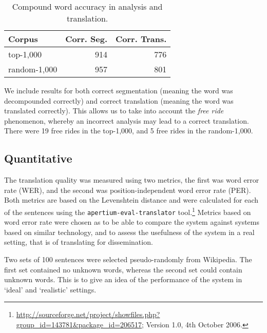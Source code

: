 \documentclass[11pt]{article}
\begin{document}
\begin{table}
  \begin{center}
  \begin{tabular}{|l|r|r|}
   \hline
   {\bf Corpus}    & {\bf Corr. Seg.}    & {\bf Corr. Trans.}\\
   \hline
   top-1,000       & 914                 &  776 \\ 
   \hline
   random-1,000    & 957                 &  801 \\ 
   \hline
  \end{tabular}
    \caption{Compound word accuracy in analysis and translation.}
    \label{table:compounds}
  \end{center}
\end{table}

We include results for both correct segmentation (meaning the word was decompounded 
correctly) and correct translation (meaning the word was translated correctly). This allows
us to take into account the {\em free ride} phenomenon, whereby an incorrect analysis
may lead to a correct translation. There were 19 free rides in the top-1,000, and 5 free 
rides in the random-1,000.

\subsection{Quantitative}

The translation quality was measured using two metrics, the first was word error rate (WER), and the 
second was position-independent word error rate (PER). Both metrics are based on the Levenshtein 
distance \cite{Levenshtein:65} and were calculated for each of the sentences using the 
{\small \texttt{apertium-eval-translator}} tool.\footnote{\url{http://sourceforge.net/project/showfiles.php?group_id=143781&package_id=206517}; Version 1.0, 4th October 2006.} Metrics based on word error rate were chosen as to be able to compare 
the system against systems based on similar technology, and to assess the usefulness of the 
system in a real setting, that is of translating for dissemination. 

Two sets of 100 sentences were selected pseudo-randomly from Wikipedia. The first set contained 
no unknown words, whereas the second set could contain unknown words. This is to give an idea
of the performance of the system in `ideal' and `realistic' settings.
\end{document}
